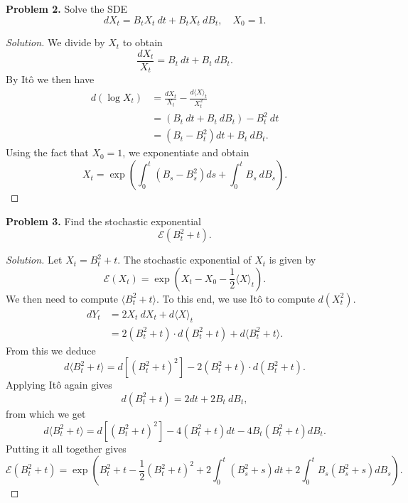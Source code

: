 \documentclass[11pt,letterpaper]{report}
\newcommand{\mcal}[1]{\mathcal{#1}}
\newcommand{\Exp}{\mathcal{E}}
\newenvironment{solution}
{\begin{proof}[Solution]}
{\end{proof}}
\begin{document}
\noindent\textbf{Problem 2. }
Solve the SDE
\begin{equation}\label{2: sde}
	dX_t = B_tX_t\ dt + B_tX_t\ dB_t,\quad X_0 = 1.
\end{equation}
\begin{solution}
	We divide by $X_t$ to obtain
	\[
	\frac{dX_t}{X_t} = B_t\ dt + B_t\ dB_t.
	\]
	By It\^o we then have
	\begin{align*}
		d(\log X_t) &= \frac{dX_t}{X_t} - \frac{d\langle X\rangle_t}{X_t^2}\\
		&= (B_t\ dt +  B_t\ dB_t) - B_t^2\ dt\\
		&= (B_t - B_t^2)dt + B_t\ dB_t.
	\end{align*}
	Using the fact that $X_0= 1$, we exponentiate and obtain
	\[
	X_t = \exp\left(\int_0^t(B_s - B_s^2)ds + \int_0^tB_s\ dB_s \right).
	\]
\end{solution}










\noindent\textbf{Problem 3. }
Find the stochastic exponential
\[
\mcal{E}(B_t^2 + t).
\]
\begin{solution}
	Let $X_t = B_t^2 + t$. The stochastic exponential of $X_t$ is given by
	\[
	\Exp(X_t) = \exp(X_t - X_0 - \frac{1}{2}\langle X\rangle_t).
	\]
	We then need to compute $\langle B_t^2 + t\rangle$. To this end, we use It\^o to compute $d(X_t^2)$.
	\begin{align*}
		dY_t &= 2X_t\ dX_t + d\langle X\rangle_t\\
		&= 2(B_t^2 + t)\cdot d(B_t^2 + t) + d\langle B_t^2 + t\rangle.
	\end{align*}
	From this we deduce
	\[
	d\langle B_t^2 + t\rangle = d[(B_t^2+t)^2]  - 2(B_t^2+t)\cdot d(B_t^2 + t).
	\]
	Applying It\^o again gives
	\[
	d(B_t^2+t) = 2dt + 2B_t\ dB_t,
	\]
	from which we get
	\[
	d\langle B_t^2+t\rangle = d[(B_t^2+t)^2] - 4(B_t^2+t)dt - 4B_t(B_t^2+t)dB_t.
	\]
	Putting it all together gives
	\[
	\Exp(B_t^2 + t) = \exp\left(B_t^2 + t -\frac{1}{2}(B_t^2 + t)^2 + 2\int_0^t(B_s^2 + s)dt + 2\int_0^tB_s(B_s^2 + s)dB_s\right).
	\]
\end{solution}
\end{document}
